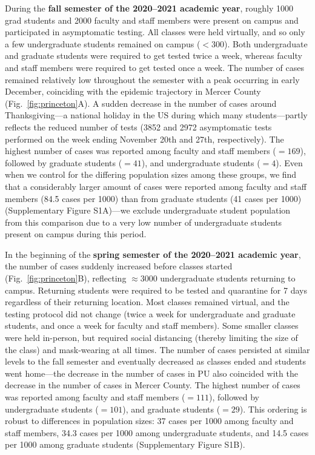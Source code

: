 \documentclass[12pt]{article}
\newcommand{\fref}[1]{Fig.~\ref{fig:#1}}
\begin{document}
During the \textbf{fall semester of the 2020--2021 academic year}, roughly 1000 grad students and 2000 faculty and staff members were present on campus and participated in asymptomatic testing. 
All classes were held virtually, and so only a few undergraduate students remained on campus ($<300$).  
Both undergraduate and graduate students were required to get tested twice a week, whereas faculty and staff members were required to get tested once a week.
The number of cases remained relatively low throughout the semester with a peak occurring in early December, coinciding with the epidemic trajectory in Mercer County (\fref{princeton}A).  
A sudden decrease in the number of cases around Thanksgiving---a national holiday in the US during which many students---partly reflects the reduced number of tests (3852 and 2972 asymptomatic tests performed on the week ending November 20th and 27th, respectively).
The highest number of cases was reported among faculty and staff members ($=169$), followed by graduate students ($=41$), and undergraduate students ($=4$).
Even when we control for the differing population sizes among these groups, we find that a considerably larger amount of cases were reported among faculty and staff members (84.5 cases per 1000) than from graduate students (41 cases per 1000) (Supplementary Figure S1A)---we exclude undergraduate student population from this comparison due to a very low number of undergraduate students present on campus during this period.

In the beginning of the \textbf{spring semester of the 2020--2021 academic year}, the number of cases suddenly increased before classes started (\fref{princeton}B), reflecting $\approx 3000$ undergraduate students returning to campus.
Returning students were required to be tested and quarantine for 7 days regardless of their returning location.
Most classes remained virtual, and the testing protocol did not change (twice a week for undergraduate and graduate students, and once a week for faculty and staff members).
Some smaller classes were held in-person, but required social distancing (thereby limiting the size of the class) and mask-wearing at all times.
The number of cases persisted at similar levels to the fall semester and eventually decreased as classes ended and students went home---the decrease in the number of cases in PU also coincided with the decrease in the number of cases in Mercer County.
The highest number of cases was reported among faculty and staff members ($=111$), followed by undergraduate students ($=101$), and graduate students ($=29$).
This ordering is robust to differences in population sizes: 37 cases per 1000 among faculty and staff members, 34.3 cases per 1000 among undergraduate students, and 14.5 cases per 1000 among graduate students (Supplementary Figure S1B).
\end{document}

